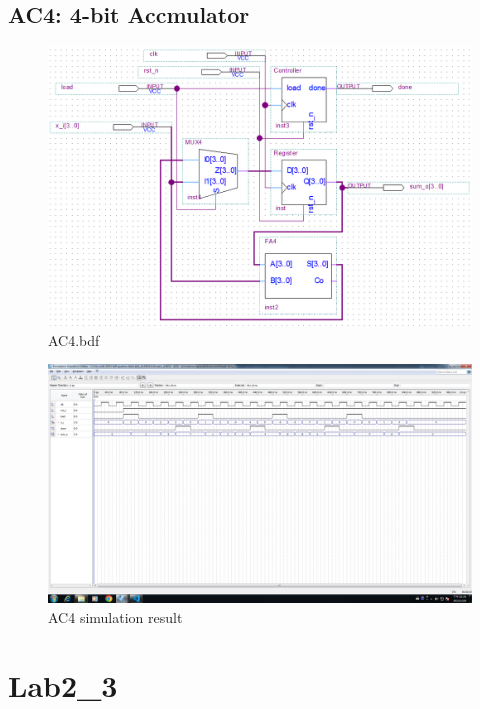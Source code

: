 \documentclass[12pt,a4paper]{article}
\begin{document}
  \subsection{AC4: 4-bit Accmulator}
  \begin{figure}[H]
    \centering
    \includegraphics[width=\linewidth]{Lab2_2/AC4_bdf.png}
    \caption{AC4.bdf}
  \end{figure}
  \begin{figure}[H]
    \centering
    \includegraphics[width=\linewidth]{Lab2_2/AC4_simulation.png}
    \caption{AC4 simulation result}
  \end{figure}

  \section{Lab2\_3}
\end{document}
